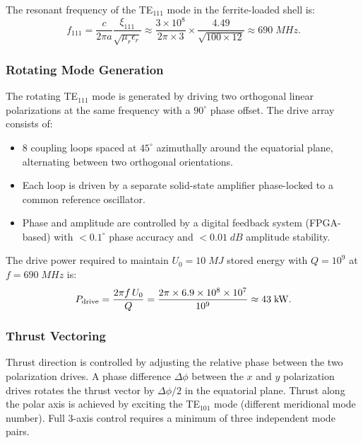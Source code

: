 \documentclass[twocolumn,prl,superscriptaddress,nofootinbib,longbibliography,floatfix]{revtex4-2}
\begin{document}
The resonant frequency of the TE$_{111}$ mode in the ferrite-loaded
shell is:
\begin{equation}
f_{111} = \frac{c}{2\pi a}
\frac{\xi_{111}}{\sqrt{\mu_r \epsilon_r}}
\approx \frac{3 \times 10^8}{2\pi \times 3}
\times \frac{4.49}{\sqrt{100 \times 12}}
\approx 690\;\si{MHz}.
\label{eq:f111}
\end{equation}

\subsubsection{Rotating Mode Generation}

The rotating TE$_{111}$ mode is generated by driving two orthogonal
linear polarizations at the same frequency with a $90^\circ$ phase
offset.  The drive array consists of:
\begin{itemize}[nosep]
\item 8 coupling loops spaced at $45^\circ$ azimuthally around the
equatorial plane, alternating between two orthogonal orientations.
\item Each loop is driven by a separate solid-state amplifier phase-locked
to a common reference oscillator.
\item Phase and amplitude are controlled by a digital feedback system
(FPGA-based) with $< 0.1^\circ$ phase accuracy and $< 0.01\;\si{dB}$
amplitude stability.
\end{itemize}

The drive power required to maintain $U_0 = 10\;\si{MJ}$ stored energy
with $Q = 10^9$ at $f = 690\;\si{MHz}$ is:
\begin{equation}
P_{\rm drive} = \frac{2\pi f\,U_0}{Q}
= \frac{2\pi \times 6.9 \times 10^8 \times 10^7}{10^9}
\approx 43\;\si{kW}.
\label{eq:P-drive}
\end{equation}

\subsubsection{Thrust Vectoring}

Thrust direction is controlled by adjusting the relative phase between
the two polarization drives.  A phase difference $\Delta\phi$ between
the $x$ and $y$ polarization drives rotates the thrust vector by
$\Delta\phi/2$ in the equatorial plane.  Thrust along the polar axis is
achieved by exciting the TE$_{101}$ mode (different meridional mode
number).  Full 3-axis control requires a minimum of three independent
mode pairs.
\end{document}
